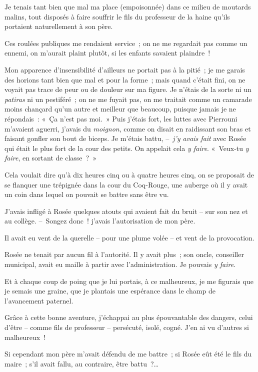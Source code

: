 \documentclass[french,twoside]{book} %
\begin{document}
Je tenais tant bien que mal ma place (empoisonnée) dans ce milieu de moutards malins, tout disposés à faire souffrir le fils du professeur de la haine qu’ils portaient naturellement à son père.\par
Ces roulées publiques me rendaient service ; on ne me regardait pas comme un ennemi, on m’aurait plaint plutôt, si les enfants savaient plaindre !\par
Mon apparence d’insensibilité d’ailleurs ne portait pas à la pitié ; je me garais des horions tant bien que mal et pour la forme ; mais quand c’était fini, on ne voyait pas trace de peur ou de douleur sur ma figure. Je n’étais de la sorte ni un \emph{patiras} ni un pestiféré ; on ne me fuyait pas, on me traitait comme un camarade moins chançard qu’un autre et meilleur que beaucoup, puisque jamais je ne répondais : « Ça n’est pas moi. » Puis j’étais fort, les luttes avec Pierrouni m’avaient aguerri, j’avais du \emph{moignon}, comme on disait en raidissant son bras et faisant gonfler son bout de biceps. Je m’étais battu, – \emph{j’y avais fait} avec Rosée qui était le plus fort de la cour des petits. On appelait cela \emph{y faire}. « Veux-tu \emph{y faire}, en sortant de classe ? »\par
Cela voulait dire qu’à dix heures cinq ou à quatre heures cinq, on se proposait de se flanquer une trépignée dans la cour du Coq-Rouge, une auberge où il y avait un coin dans lequel on pouvait se battre sans être vu.\par
J’avais infligé à Rosée quelques atouts qui avaient fait du bruit – sur son nez et au collège. – Songez donc ! j’avais l’autorisation de mon père.\par
Il avait eu vent de la querelle – pour une plume volée – et vent de la provocation.\par
Rosée ne tenait par aucun fil à l’autorité. Il y avait plus ; son oncle, conseiller municipal, avait eu maille à partir avec l’administration. Je pouvais \emph{y faire}.\par
Et à chaque coup de poing que je lui portais, à ce malheureux, je me figurais que je semais une graine, que je plantais une espérance dans le champ de l’avancement paternel.\par
Grâce à cette bonne aventure, j’échappai au plus épouvantable des dangers, celui d’être – comme fils de professeur – persécuté, isolé, cogné. J’en ai vu d’autres si malheureux !\par
Si cependant mon père m’avait défendu de me battre ; si Rosée eût été le fils du maire ; s’il avait fallu, au contraire, être battu ?…\par
\end{document}
